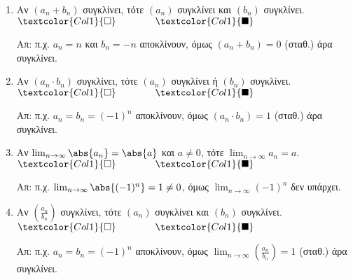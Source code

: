 \begin{enumerate}[itemsep=.5\baselineskip]
  \item \textcolor{Col1}{Αν $ (a_{n}+b_{n}) $ συγκλίνει, τότε $ (a_{n}) 
    $ συγκλίνει και $ (b_{n}) $ συγκλίνει}.
    \hfill $\textcolor{Col1}{\square} \qquad \qquad \textcolor{Col1}{\blacksquare}$

    Απ: π.χ. $ a_{n}= n $ και $ b_{n}=-n $ αποκλίνουν, όμως $ (a_{n}+b_{n})=0 $ 
    (σταθ.) άρα συγκλίνει.

  \item \textcolor{Col1}{Αν $ (a_{n}\cdot b_{n}) $ συγκλίνει, τότε $ (a_{n}) $ 
      συγκλίνει ή $ (b_{n}) $ συγκλίνει}.
    \hfill $\textcolor{Col1}{\square} \qquad \qquad \textcolor{Col1}{\blacksquare}$

    Απ: π.χ. $ a_{n}=b_{n}=(-1)^{n} $ αποκλίνουν, όμως $ (a_{n}\cdot
    b_{n})=1 $ (σταθ.) άρα συγκλίνει. 

  \item \textcolor{Col1}{Αν $ \lim_{n \to \infty} \abs{a_{n}} = \abs{a} $ και 
      $ a \neq 0 $, τότε $ \lim_{n \to \infty} a_{n} = a $}.
    \hfill $\textcolor{Col1}{\square} \qquad \qquad \textcolor{Col1}{\blacksquare}$

    Απ: π.χ. $ \lim_{n \to \infty} \abs{(-1)^{n}} = 1 \neq 0 $, όμως 
    $ \lim_{n \to \infty} (-1)^{n} $ δεν υπάρχει.

  \item \textcolor{Col1}{Αν $ \left(\frac{a_{n}}{b_{n}}\right) $ συγκλίνει, τότε 
      $ (a_{n}) $ συγκλίνει και $ (b_{n}) $ συγκλίνει}.
    \hfill $\textcolor{Col1}{\square} \qquad \qquad \textcolor{Col1}{\blacksquare}$

    Απ: π.χ. $ a_{n}=b_{n}=(-1)^{n} $ αποκλίνουν, όμως $ \lim_{n
    \to \infty} (\frac{a_{n}}{b_{n}})=1 $ (σταθ.) άρα συγκλίνει. 
\end{enumerate}




